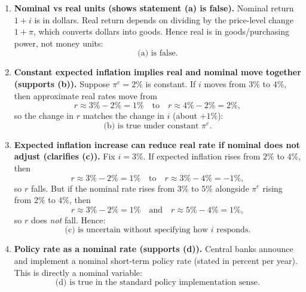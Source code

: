 \documentclass[12pt]{article}
\begin{document}
\begin{enumerate}[label=(\alph*)]
\item \textbf{Nominal vs real units (shows statement (a) is false).}
Nominal return \(1+i\) is in dollars. Real return depends on dividing by the price-level change \(1+\pi\), which converts dollars into goods. Hence real is in goods/purchasing power, not money units:
\[
\boxed{\,\text{(a) is false.}\,}
\]

\item \textbf{Constant expected inflation implies real and nominal move together (supports (b)).}
Suppose \(\pi^e=2\%\) is constant. If \(i\) moves from \(3\%\) to \(4\%\), then approximate real rates move from
\[
r \approx 3\%-2\%=1\% \quad\text{to}\quad r \approx 4\%-2\%=2\%,
\]
so the change in \(r\) matches the change in \(i\) (about \(+1\%\)):
\[
\boxed{\,\text{(b) is true under constant }\pi^e.\,}
\]

\item \textbf{Expected inflation increase can reduce real rate if nominal does not adjust (clarifies (c)).}
Fix \(i=3\%\). If expected inflation rises from \(2\%\) to \(4\%\), then
\[
r \approx 3\%-2\%=1\% \quad\text{to}\quad r \approx 3\%-4\%=-1\%,
\]
so \(r\) falls. But if the nominal rate rises from \(3\%\) to \(5\%\) alongside \(\pi^e\) rising from \(2\%\) to \(4\%\), then
\[
r \approx 3\%-2\%=1\% \quad\text{and}\quad r \approx 5\%-4\%=1\%,
\]
so \(r\) does \emph{not} fall. Hence:
\[
\boxed{\,\text{(c) is uncertain without specifying how }i\text{ responds.}\,}
\]

\item \textbf{Policy rate as a nominal rate (supports (d)).}
Central banks announce and implement a nominal short-term policy rate (stated in percent per year). This is directly a nominal variable:
\[
\boxed{\,\text{(d) is true in the standard policy implementation sense.}\,}
\]
\end{enumerate}
\end{document}
